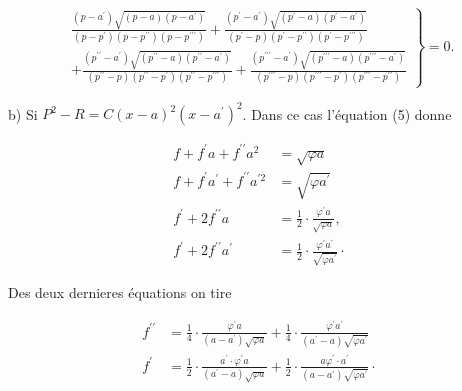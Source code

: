 \documentclass{article}
\begin{document}
\[
\left.\begin{array}{c}
\frac{\left(p-a^{\prime}\right) \sqrt{(p-a)\left(p-a^{\prime}\right)}}{\left(p-p^{\prime}\right)\left(p-p^{\prime \prime}\right)\left(p-p^{\prime \prime \prime}\right)}+\frac{\left(p^{\prime}-a^{\prime}\right) \sqrt{\left(p^{\prime}-a\right)\left(p^{\prime}-a^{\prime}\right)}}{\left(p^{\prime}-p\right)\left(p^{\prime}-p^{\prime \prime}\right)\left(p^{\prime}-p^{\prime \prime \prime}\right)} \\
+\frac{\left(p^{\prime \prime}-a^{\prime}\right) \sqrt{\left(p^{\prime \prime}-a\right)\left(p^{\prime \prime}-a^{\prime}\right)}}{\left(p^{\prime \prime}-p\right)\left(p^{\prime \prime}-p^{\prime}\right)\left(p^{\prime \prime}-p^{\prime \prime \prime}\right)}+\frac{\left(p^{\prime \prime \prime}-a^{\prime}\right) \sqrt{\left(p^{\prime \prime \prime}-a\right)\left(p^{\prime \prime \prime}-a^{\prime}\right)}}{\left(p^{\prime \prime \prime}-p\right)\left(p^{\prime \prime \prime}-p^{\prime}\right)\left(p^{\prime \prime \prime}-p^{\prime \prime}\right)}
\end{array}\right\}=0 .
\]

b) Si \(P^{2}-R=C(x-a)^{2}\left(x-a^{\prime}\right)^{2}\). Dans ce cas l'équation (5) donne

\[
\begin{aligned}
f+f^{\prime} a+f^{\prime \prime} a^{2} & =\sqrt{\varphi a} \\
f+f^{\prime} a^{\prime}+f^{\prime \prime} a^{\prime 2} & =\sqrt{\varphi a^{\prime}} \\
f^{\prime}+2 f^{\prime \prime} a & =\frac{1}{2} \cdot \frac{\varphi^{\prime} a}{\sqrt{\varphi a}}, \\
f^{\prime}+2 f^{\prime \prime} a^{\prime} & =\frac{1}{2} \cdot \frac{\varphi^{\prime} a^{\prime}}{\sqrt{\varphi a^{\prime}}} \cdot
\end{aligned}
\]

Des deux dernieres équations on tire

\[
\begin{aligned}
f^{\prime \prime} & =\frac{1}{4} \cdot \frac{\varphi^{\prime} a}{\left(a-a^{\prime}\right) \sqrt{\varphi a}}+\frac{1}{4} \cdot \frac{\varphi^{\prime} a^{\prime}}{\left(a^{\prime}-a\right) \sqrt{\varphi a^{\prime}}} \\
f^{\prime} & =\frac{1}{2} \cdot \frac{a^{\prime} \cdot \varphi^{\prime} a}{\left(a^{\prime}-a\right) \sqrt{\varphi a}}+\frac{1}{2} \cdot \frac{a \varphi^{\prime} \cdot a^{\prime}}{\left(a-a^{\prime}\right) \sqrt{\varphi a^{\prime}}} \cdot
\end{aligned}
\]
\end{document}
